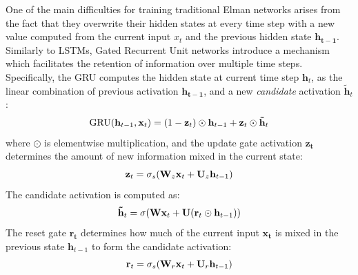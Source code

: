One of the main difficulties for training traditional Elman networks
arises from the fact that they overwrite their hidden states at every
time step with a new value computed from the current input $x_{t}$ and
the previous hidden state $\mathbf{h_{t-1}}$. Similarly to LSTMs,
Gated Recurrent Unit networks introduce a mechanism which facilitates the retention of 
information over multiple time steps.
Specifically, the GRU computes the hidden state at current time step $\mathbf{h}_{t}$, as the
linear combination of previous activation $\mathbf{h_{t-1}}$, and a new
{\it candidate} activation $\mathbf{\tilde{h}}_t$:
%
\vspace{-.2cm}
\begin{equation}
  \mathrm{GRU}(\mathbf{h}_{t-1}, \mathbf{x}_t) = (1 - \mathbf{z}_t)\odot \mathbf{h}_{t-1} + \mathbf{z}_t \odot \mathbf{\tilde{h}}_t
\vspace{-.1cm}
\end{equation}
%
where $\odot$ is elementwise multiplication, and the update gate
activation $\mathbf{z_{t}}$ determines the amount of new information
mixed in the current state:
%
\vspace{-.1cm}
\begin{equation}
\label{eq:gru-update}
   \mathbf{z}_t = \sigma_s(\mathbf{W}_z \mathbf{x}_t + \mathbf{U}_z \mathbf{h}_{t-1})
\vspace{-.1cm}
\end{equation}
%
The candidate activation is computed as:
%
\vspace{-.2cm}
\begin{equation}
\label{eq:gru-cand}
   \mathbf{\tilde{h}}_t = \sigma(\mathbf{W} \mathbf{x}_t + \mathbf{U}(\mathbf{r}_t \odot \mathbf{h}_{t-1}))
\vspace{-.1cm}
\end{equation}
%
The reset gate $\mathbf{r_{t}}$ determines how much of the current
input $\mathbf{x_{t}}$ is mixed in the previous state
$\mathbf{h}_{t-1}$ to form the candidate activation:
%
\vspace{-.2cm}
\begin{equation}
\label{eq:gru-reset}
   \mathbf{r}_t = \sigma_s(\mathbf{W}_r \mathbf{x}_t + \mathbf{U}_r \mathbf{h}_{t-1})
\vspace{-.1cm}
\end{equation}


